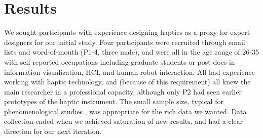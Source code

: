 %
% 
\section{Results}

We sought participants with experience designing haptics as a proxy for expert designers for our initial study.
Four participants were recruited through email lists and word-of-mouth (P1-4, three male), and were all in the age range of 26-35 with self-reported occupations including graduate students or post-docs in information visualization, HCI, and human-robot interaction.
All had experience working with haptic technology, and (because of this requirement) all knew the main researcher in a professional capacity, although only P2 had seen earlier prototypes of the haptic instrument.
The small sample size, typical for phenomenological studies \cite{Creswell2013}, was appropriate for the rich data we wanted.
Data collection ended when we achieved saturation of new results, and had a clear direction for our next iteration.



%
%




